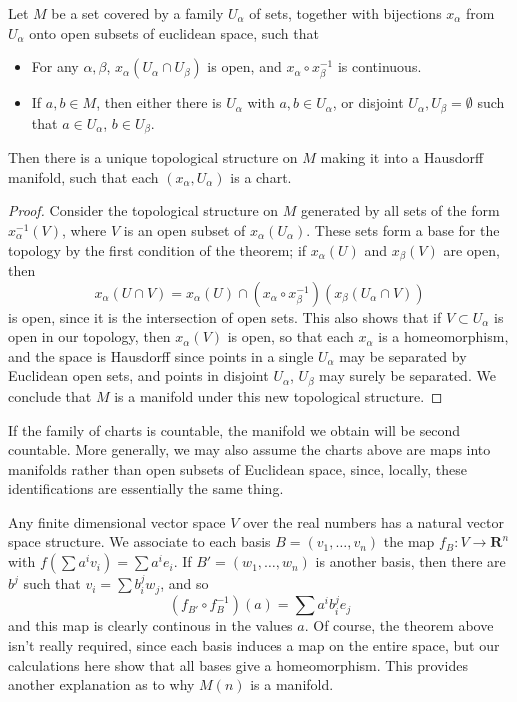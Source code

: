 \begin{theorem}
    Let $M$ be a set covered by a family $U_\alpha$ of sets, together with bijections $x_\alpha$ from $U_\alpha$ onto open subsets of euclidean space, such that
    \begin{itemize}
        \item For any $\alpha, \beta$, $x_\alpha(U_\alpha \cap U_\beta)$ is open, and $x_\alpha \circ x_\beta^{-1}$ is continuous.
        \item If $a, b \in M$, then either there is $U_\alpha$ with $a,b \in U_\alpha$, or disjoint $U_\alpha, U_\beta = \emptyset$ such that $a \in U_\alpha$, $b \in U_\beta$.
    \end{itemize}
    Then there is a unique topological structure on $M$ making it into a Hausdorff manifold, such that each $(x_\alpha, U_\alpha)$ is a chart.
\end{theorem}
\begin{proof}
    Consider the topological structure on $M$ generated by all sets of the form $x_\alpha^{-1}(V)$, where $V$ is an open subset of $x_\alpha(U_\alpha)$. These sets form a base for the topology by the first condition of the theorem; if $x_\alpha(U)$ and $x_\beta(V)$ are open, then
    \[ x_\alpha(U \cap V) = x_\alpha(U) \cap (x_\alpha \circ x_\beta^{-1})(x_\beta(U_\alpha \cap V)) \]
    is open, since it is the intersection of open sets. This also shows that if $V \subset U_\alpha$ is open in our topology, then $x_\alpha(V)$ is open, so that each $x_\alpha$ is a homeomorphism, and the space is Hausdorff since points in a single $U_\alpha$ may be separated by Euclidean open sets, and points in disjoint $U_\alpha$, $U_\beta$ may surely be separated. We conclude that $M$ is a manifold under this new topological structure.
\end{proof}

\begin{remark}
    If the family of charts is countable, the manifold we obtain will be second countable. More generally, we may also assume the charts above are maps into manifolds rather than open subsets of Euclidean space, since, locally, these identifications are essentially the same thing.
\end{remark}

\begin{example}
    Any finite dimensional vector space $V$ over the real numbers has a natural vector space structure. We associate to each basis $B = (v_1, \dots, v_n)$ the map $f_B: V \to \mathbf{R}^n$ with $f(\sum a^iv_i) = \sum a^ie_i$. If $B' = (w_1, \dots, w_n)$ is another basis, then there are $b^j$ such that $v_i = \sum b^j_i w_j$, and so
    \[ (f_{B'} \circ f_B^{-1})(a) = \sum a^i b_i^j e_j \]
    and this map is clearly continous in the values $a$. Of course, the theorem above isn't really required, since each basis induces a map on the entire space, but our calculations here show that all bases give a homeomorphism. This provides another explanation as to why $M(n)$ is a manifold.
\end{example}

